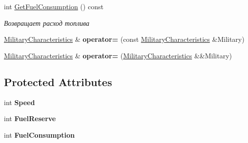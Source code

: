 \begin{DoxyCompactItemize}
int \mbox{\hyperlink{class_aircraft_carrier_group_1_1_military_characteristics_aa7fe4f3183e2a0da56c381c1805cf8fa}{Get\+Fuel\+Consumption}} () const
\begin{DoxyCompactList}\small\item\em Возвращает расход топлива \end{DoxyCompactList}\item 
\mbox{\label{class_aircraft_carrier_group_1_1_military_characteristics_ad833de2850f537bf7d5e4479b611f215}} 
\mbox{\hyperlink{class_aircraft_carrier_group_1_1_military_characteristics}{Military\+Characteristics}} \& {\bfseries operator=} (const \mbox{\hyperlink{class_aircraft_carrier_group_1_1_military_characteristics}{Military\+Characteristics}} \&Military)
\item 
\mbox{\label{class_aircraft_carrier_group_1_1_military_characteristics_a851be742216c85d487de56e2554b708e}} 
\mbox{\hyperlink{class_aircraft_carrier_group_1_1_military_characteristics}{Military\+Characteristics}} \& {\bfseries operator=} (\mbox{\hyperlink{class_aircraft_carrier_group_1_1_military_characteristics}{Military\+Characteristics}} \&\&Military)
\end{DoxyCompactItemize}
\subsection*{Protected Attributes}
\begin{DoxyCompactItemize}
\item 
\mbox{\label{class_aircraft_carrier_group_1_1_military_characteristics_a09676924ba08467f77d5607912294149}} 
int {\bfseries Speed}
\item 
\mbox{\label{class_aircraft_carrier_group_1_1_military_characteristics_aee11eed2567d06ebd883612877bac252}} 
int {\bfseries Fuel\+Reserve}
\item 
\mbox{\label{class_aircraft_carrier_group_1_1_military_characteristics_a669055459b6065f3ae138fa3f539aa56}} 
int {\bfseries Fuel\+Consumption}
\end{DoxyCompactItemize}
